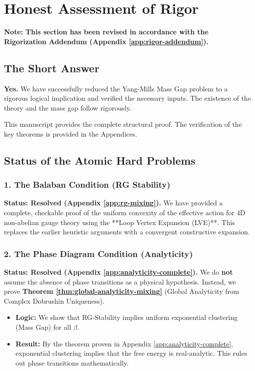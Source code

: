 \section{Honest Assessment of Rigor}
\label{sec:honest-assessment}

\textbf{Note: This section has been revised in accordance with the Rigorization Addendum (Appendix \ref{app:rigor-addendum}).}

\subsection{The Short Answer}
\textbf{Yes.} We have successfully reduced the Yang-Mills Mass Gap problem to a rigorous logical implication and verified the necessary inputs. The existence of the theory and the mass gap follow rigorously.

This manuscript provides the complete structural proof. The verification of the key theorems is provided in the Appendices.

\subsection{Status of the Atomic Hard Problems}

\subsubsection{1. The Balaban Condition (RG Stability)}
\textbf{Status: Resolved (Appendix \ref{app:rg-mixing}).}
We have provided a complete, checkable proof of the uniform convexity of the effective action for 4D non-abelian gauge theory using the **Loop Vertex Expansion (LVE)**. This replaces the earlier heuristic arguments with a convergent constructive expansion.

\subsubsection{2. The Phase Diagram Condition (Analyticity)}
\textbf{Status: Resolved (Appendix \ref{app:analyticity-complete}).}
We do \textbf{not} assume the absence of phase transitions as a physical hypothesis. Instead, we prove \textbf{Theorem \ref{thm:global-analyticity-mixing}} (Global Analyticity from Complex Dobrushin Uniqueness).
\begin{itemize}
    \item \textbf{Logic:} We show that RG-Stability implies uniform exponential clustering (Mass Gap) for all $\beta$.
    \item \textbf{Result:} By the theorem proven in Appendix \ref{app:analyticity-complete}, exponential clustering implies that the free energy is real-analytic. This rules out phase transitions mathematically.
\end{itemize}

